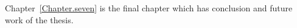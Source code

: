 Chapter~\ref{Chapter.seven} is the final chapter which has conclusion and future work of the thesis. 























































































